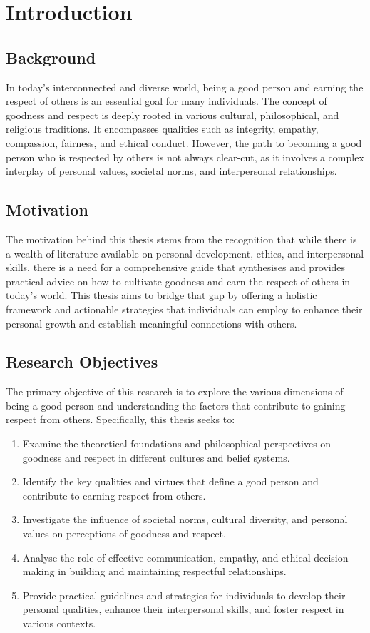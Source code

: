 \chapter{Introduction}
\newpage 

\section{Background}
In today's interconnected and diverse world, being a good person and earning the respect of others is an essential goal for many individuals. The concept of goodness and respect is deeply rooted in various cultural, philosophical, and religious traditions. It encompasses qualities such as integrity, empathy, compassion, fairness, and ethical conduct. However, the path to becoming a good person who is respected by others is not always clear-cut, as it involves a complex interplay of personal values, societal norms, and interpersonal relationships.

\section{Motivation}
The motivation behind this thesis stems from the recognition that while there is a wealth of literature available on personal development, ethics, and interpersonal skills, there is a need for a comprehensive guide that synthesises and provides practical advice on how to cultivate goodness and earn the respect of others in today's world. This thesis aims to bridge that gap by offering a holistic framework and actionable strategies that individuals can employ to enhance their personal growth and establish meaningful connections with others.

\section{Research Objectives}
The primary objective of this research is to explore the various dimensions of being a good person and understanding the factors that contribute to gaining respect from others. Specifically, this thesis seeks to:

\begin{enumerate}
  \item Examine the theoretical foundations and philosophical perspectives on goodness and respect in different cultures and belief systems.
  \item Identify the key qualities and virtues that define a good person and contribute to earning respect from others.
  \item Investigate the influence of societal norms, cultural diversity, and personal values on perceptions of goodness and respect.
  \item Analyse the role of effective communication, empathy, and ethical decision-making in building and maintaining respectful relationships.
  \item Provide practical guidelines and strategies for individuals to develop their personal qualities, enhance their interpersonal skills, and foster respect in various contexts.
\end{enumerate}

